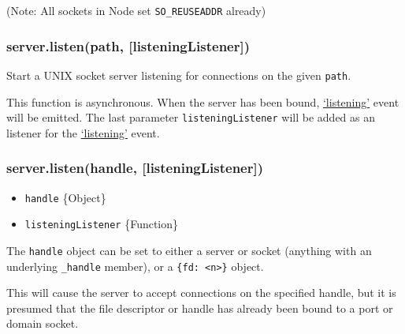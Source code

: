 \begin{Shaded}
\begin{Highlighting}[]
\NormalTok{(}\NormalTok{, } 
   \NormalTok{(} \NormalTok{== }\NormalTok{) \{}
    \NormalTok{(}\NormalTok{);}
     \NormalTok{() \{}
      \NormalTok{();}
    \NormalTok{\}, }\NormalTok{);}
  \NormalTok{\}}
\NormalTok{\});}
\end{Highlighting}
\end{Shaded}

(Note: All sockets in Node set \texttt{SO\_REUSEADDR} already)

\subsubsection{server.listen(path, {[}listeningListener{]})}

Start a UNIX socket server listening for connections on the given
\texttt{path}.

This function is asynchronous. When the server has been bound,
\hyperref[net\_event\_listening]{`listening'} event will be emitted. The
last parameter \texttt{listeningListener} will be added as an listener
for the \hyperref[net\_event\_listening]{`listening'} event.

\subsubsection{server.listen(handle, {[}listeningListener{]})}

\begin{itemize}
\item
  \texttt{handle} \{Object\}
\item
  \texttt{listeningListener} \{Function\}
\end{itemize}

The \texttt{handle} object can be set to either a server or socket
(anything with an underlying \texttt{\_handle} member), or a
\texttt{\{fd: \textless{}n\textgreater{}\}} object.

This will cause the server to accept connections on the specified
handle, but it is presumed that the file descriptor or handle has
already been bound to a port or domain socket.

